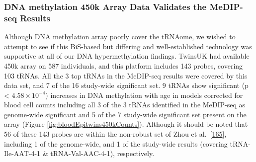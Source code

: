 \documentclass[
]{book}
\begin{document}
\hypertarget{dna-methylation-450k-array-data-validates-the-medip-seq-results}{%
\subsubsection{DNA methylation 450k Array Data Validates the MeDIP-seq Results}\label{dna-methylation-450k-array-data-validates-the-medip-seq-results}}

Although DNA methylation array poorly cover the tRNAome, we wished to attempt to see if this BiS-based but differing and well-established technology was supportive at all of our DNA hypermethylation findings.
TwinsUK had available 450k array on 587 individuals, and this platform includes 143 probes, covering 103 tRNAs.
All the 3 top tRNAs in the MeDIP-seq results were covered by this data set, and 7 of the 16 study-wide significant set.
9 tRNAs show significant (p \textless{} \(4.58\times10^{-4}\)) increases in DNA methylation with age in models corrected for blood cell counts including all 3 of the 3 tRNAs identified in the MeDIP-seq as genome-wide significant and 5 of the 7 study-wide significant set present on the array (Figure \ref{fig:bloodEpitwins450kCounts}).
Although it should be noted that 56 of these 143 probes are within the non-robust set of Zhou et al.~{[}\protect\hyperlink{ref-Zhou2017}{165}{]}, including 1 of the genome-wide, and 1 of the study-wide results (covering tRNA-Ile-AAT-4-1 \& tRNA-Val-AAC-4-1), respectively.
\end{document}
